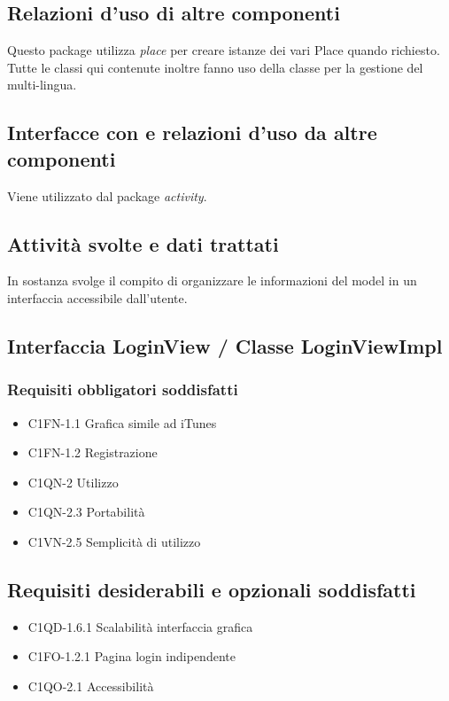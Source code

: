 \subsection*{Relazioni
d'uso di altre componenti} Questo package utilizza \emph{place} per creare istanze dei vari Place quando richiesto.
Tutte le classi qui contenute inoltre fanno uso della classe 
per la gestione del multi-lingua. 
\subsection*{Interfacce con e relazioni d'uso
da altre componenti} Viene utilizzato dal package \emph{activity}.
\subsection*{Attivit\`a svolte e dati trattati}
In sostanza svolge il compito di organizzare le informazioni del model in un
interfaccia accessibile dall'utente.


\subsection{Interfaccia LoginView / Classe LoginViewImpl}
\subsubsection*{Requisiti obbligatori soddisfatti}
\begin{itemize}
    \item C1FN-1.1 Grafica simile ad iTunes
	\item C1FN-1.2 Registrazione
	\item C1QN-2 Utilizzo
	\item C1QN-2.3 Portabilit\`a
	\item C1VN-2.5 Semplicit\`a di utilizzo
\end{itemize}
\subsection*{Requisiti desiderabili e opzionali soddisfatti}
\begin{itemize}
    \item C1QD-1.6.1 Scalabilit\`a interfaccia grafica
    \item C1FO-1.2.1 Pagina login indipendente
    \item C1QO-2.1 Accessibilit\`a
\end{itemize}
